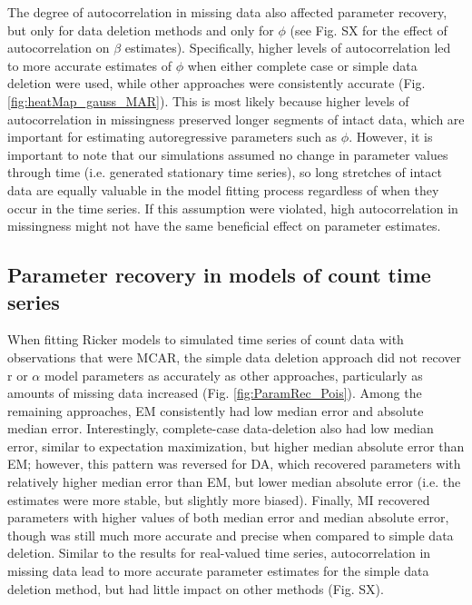 \documentclass{article}
\begin{document}
The degree of autocorrelation in missing data also affected parameter recovery, but only for data deletion methods and only for $\phi$ (see Fig. SX for the effect of autocorrelation on $\beta$ estimates). Specifically, higher levels of autocorrelation led to more accurate estimates of $\phi$ when either complete case or simple data deletion were used, while other approaches were consistently accurate (Fig. \ref{fig:heatMap_gauss_MAR}). This is most likely because higher levels of autocorrelation in missingness preserved longer segments of intact data, which are important for estimating autoregressive parameters such as $\phi$. However, it is important to note that our simulations assumed no change in parameter values through time (i.e. generated stationary time series), so long stretches of intact data are equally valuable in the model fitting process regardless of when they occur in the time series. If this assumption were violated, high autocorrelation in missingness might not have the same beneficial effect on parameter estimates.   

\subsection*{Parameter recovery in models of count time series}
When fitting Ricker models to simulated time series of count data with observations that were MCAR, the simple data deletion approach did not recover r or $\alpha$ model parameters as accurately as other approaches, particularly as amounts of missing data increased (Fig. \ref{fig:ParamRec_Pois}). Among the remaining approaches, EM consistently had low median error and absolute median error. Interestingly, complete-case data-deletion also had low median error, similar to expectation maximization, but higher median absolute error than EM; however, this pattern was reversed for DA, which recovered parameters with relatively higher median error than EM, but lower median absolute error (i.e. the estimates were more stable, but slightly more biased). Finally, MI recovered parameters with higher values of both median error and median absolute error, though was still much more accurate and precise when compared to simple data deletion. %
Similar to the results for real-valued time series, autocorrelation in missing data lead to more accurate parameter estimates for the simple data deletion method, but had little impact on other methods (Fig. SX).
\end{document}
